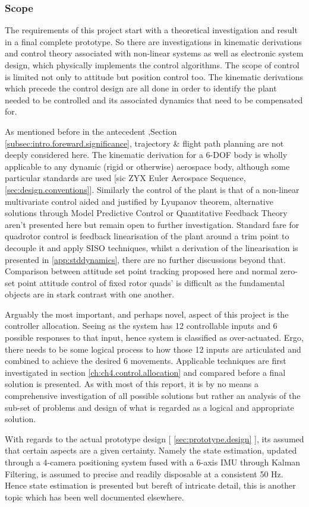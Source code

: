 \subsubsection{Scope}
\label{subsubsec:intro.foreward.scope}
The requirements of this project start with a theoretical investigation and result in a final complete prototype. So there are investigations in kinematic derivations and control theory associated with non-linear systems as well as electronic system design, which physically implements the control algorithms. The scope of control is limited not only to attitude but position control too. The kinematic derivations which precede the control design are all done in order to identify the plant needed to be controlled and its associated dynamics that need to be compensated for.
\par
As mentioned before in the antecedent ,Section \ref{subsec:intro.foreward.significance}, trajectory \& flight path planning are not deeply considered here. The kinematic derivation for a 6-DOF body is wholly applicable to any dynamic (rigid or otherwise) aerospace body, although some particular standards are used [sic ZYX Euler Aerospace Sequence, \ref{sec:design.conventions}]. Similarly the control of the plant is that of a non-linear multivariate control aided and justified by Lyupanov theorem, alternative solutions through Model Predictive Control or Quantitative Feedback Theory aren't presented here but remain open to further investigation. Standard fare for quadrotor control is feedback linearisation of the plant around a trim point to decouple it and apply SISO techniques, whilst a derivation of the linearisation is presented in \ref{app:stddynamics}, there are no further discussions beyond that. Comparison between attitude set point tracking proposed here and normal zero-set point attitude control of fixed rotor quads' is difficult as the fundamental objects are in stark contrast with one another.
\par
Arguably the most important, and perhaps novel, aspect of this project is the controller allocation. Seeing as the system has 12 controllable inputs and 6 possible responses to that input, hence system is classified as over-actuated. Ergo, there needs to be some logical process to how those 12 inputs are articulated and combined to achieve the desired 6 movements. Applicable techniques are first investigated in section \ref{ch:ch4.control.allocation} and compared before a final solution is presented. As with most of this report, it is by no means a comprehensive investigation of all possible solutions but rather an analysis of the sub-set of problems and design of what is regarded as a logical and appropriate solution.
\par
With regards to the actual prototype design [ \ref{sec:prototype.design} ], its assumed that certain aspects are a given certainty. Namely the state estimation, updated through a 4-camera positioning system fused with a 6-axis IMU through Kalman Filtering, is assumed to precise and readily disposable at a consistent 50 Hz. Hence state estimation is presented but bereft of intricate detail, this is another topic which has been well documented elsewhere.
